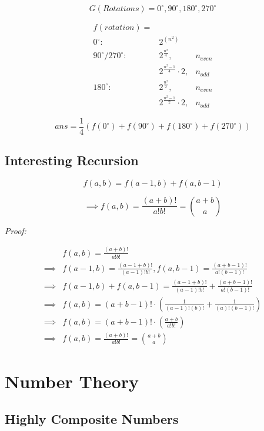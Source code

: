 	$$ G (Rotations) = 0^{\circ}, 90^{\circ}, 180^{\circ}, 270^{\circ} $$

	\begin{centering}
	\begin{align*}
	f(rotation) = & \\
	0^{\circ}: 				& 2^{(n^2)}  \\
	90^{\circ}/270^{\circ}:	& 2^{ \frac{n^2}{4} }, & n_{even} \\
							& 2^{ \frac{n^2-1}{4} } \cdot 2 , & n_{odd} \\
	180^{\circ}:			& 2^{ \frac{n^2}{2} }, & n_{even} \\
							& 2^{ \frac{n^2-1}{2} } \cdot 2 , & n_{odd}
	\end{align*}
	\end{centering}

	
	$$ans = \frac{1}{4} (f(0^{\circ}) + f(90^{\circ}) + f(180^{\circ}) + f(270^{\circ})) $$

	\subsection{Interesting Recursion}

	$$ f(a, b) = f(a-1, b) + f(a, b-1) $$

	$$ \implies f(a, b) = \frac{(a+b)!}{a! b!} = \binom{a+b}{a} $$

	\textit{Proof:}
	
	\begin{align*}
	&f(a, b) = \frac{(a+b)!}{a! b!}  \\ 
	\implies &f(a-1, b) = \frac{(a-1+b)!}{(a-1)! b!}, f(a, b-1) = \frac{(a+b-1)!}{a! (b-1)!}  \\
	\implies &f(a-1, b) + f(a, b-1) = \frac{(a-1+b)!}{(a-1)! b!} + \frac{(a+b-1)!}{a! (b-1)!}  \\
	\implies &f(a, b) = (a+b-1)! \cdot ( \frac{1}{(a-1)!(b)!} + \frac{1}{(a)!(b-1)!} )  \\
	\implies &f(a, b) = (a+b-1)! \cdot ( \frac{a+b}{a! b!} ) \\
	\implies &f(a, b) = \frac{(a+b)!}{a! b!} = \binom{a+b}{a} 
	\end{align*}

	
\section{Number Theory}

\subsection{Highly Composite Numbers}

